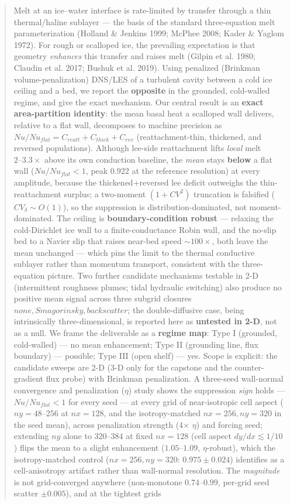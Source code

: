 \documentclass[tc, manuscript]{copernicus}
\begin{document}
\begin{abstract}
Melt at an ice–water interface is rate-limited by transfer through a thin thermal/haline sublayer — the basis of the standard three-equation melt parameterization (Holland \& Jenkins 1999; McPhee 2008; Kader \& Yaglom 1972). For rough or scalloped ice, the prevailing expectation is that geometry \emph{enhances} this transfer and raises melt (Gilpin et al. 1980; Claudin et al. 2017; Bushuk et al. 2019). Using penalized (Brinkman volume-penalization) DNS/LES of a turbulent cavity between a cold ice ceiling and a bed, we report the \textbf{opposite} in the grounded, cold-walled regime, and give the exact mechanism. Our central result is an \textbf{exact area-partition identity}: the mean basal heat a scalloped wall delivers, relative to a flat wall, decomposes to machine precision as $Nu/Nu_{flat} = C_{reatt} + C_{thick} + C_{rev}$ (reattachment-thin, thickened, and reversed populations). Although lee-side reattachment lifts \emph{local} melt $2\mbox{--}3.3\times $ above its own conduction baseline, the \emph{mean} stays \textbf{below} a flat wall ($Nu/Nu_{flat}<1$, peak $0.922$ at the reference resolution) at every amplitude, because the thickened+reversed lee deficit outweighs the thin-reattachment surplus; a two-moment $(1+CV^{2})$ truncation is falsified ($CV_\delta \sim O(1)$), so the suppression is distribution-dominated, not moment-dominated. The ceiling is \textbf{boundary-condition robust} — relaxing the cold-Dirichlet ice wall to a finite-conductance Robin wall, and the no-slip bed to a Navier slip that raises near-bed speed $\sim 100\times $, both leave the mean unchanged — which pins the limit to the thermal conductive sublayer rather than momentum transport, consistent with the three-equation picture. Two further candidate mechanisms testable in 2-D (intermittent roughness plumes; tidal hydraulic switching) also produce no positive mean signal across three subgrid closures ${none, Smagorinsky, backscatter}$; the double-diffusive case, being intrinsically three-dimensional, is reported here as \textbf{untested in 2-D}, not as a null. We frame the deliverable as a \textbf{regime map}: Type I (grounded, cold-walled) — no mean enhancement; Type II (grounding line, flux boundary) — possible; Type III (open shelf) — yes. Scope is explicit: the candidate sweeps are 2-D (3-D only for the capstone and the counter-gradient flux probe) with Brinkman penalization. A three-seed wall-normal convergence and penalization ($\eta $) study shows the suppression \emph{sign} holds — $Nu/Nu_{flat}<1$ for every seed — at every grid of near-isotropic cell aspect ($ny=48\mbox{--}256$ at $nx=128$, and the isotropy-matched $nx=256, ny=320$ in the seed mean), across penalization strength (4\ensuremath{\times} $\eta $) and forcing seed; extending $ny$ alone to $320\mbox{--}384$ at fixed $nx=128$ (cell aspect $dy/dx\lesssim 1/10$) flips the mean to a slight enhancement ($1.05\mbox{--}1.09$, \ensuremath{\eta}-robust), which the isotropy-matched control ($nx=256, ny=320$: $0.975\pm 0.024$) identifies as a cell-anisotropy artifact rather than wall-normal resolution. The \emph{magnitude} is not grid-converged anywhere (non-monotone $0.74\mbox{--}0.99$, per-grid seed scatter $\pm 0.005$), and at the tightest grids 
\end{abstract}
\end{document}
